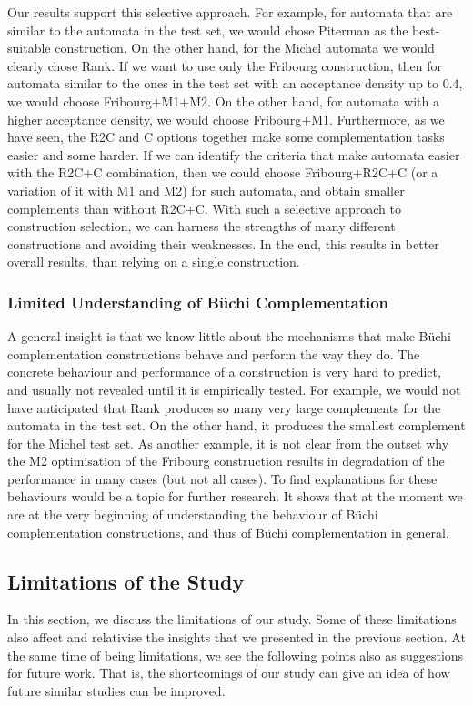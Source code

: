 Our results support this selective approach. For example, for automata that are similar to the automata in the \goal{} test set, we would chose Piterman as the best-suitable construction. On the other hand, for the Michel automata we would clearly chose Rank. If we want to use only the Fribourg construction, then for automata similar to the ones in the \goal{} test set with an acceptance density up to 0.4, we would choose Fribourg+M1+M2. On the other hand, for automata with a higher acceptance density, we would choose Fribourg+M1. Furthermore, as we have seen, the R2C and C options together make some complementation tasks easier and some harder. If we can identify the criteria that make automata easier with the R2C+C combination, then we could choose Fribourg+R2C+C (or a variation of it with M1 and M2) for such automata, and obtain smaller complements than without R2C+C. With such a selective approach to construction selection, we can harness the strengths of many different constructions and avoiding their weaknesses. In the end, this results in better overall results, than relying on a single construction.

\subsubsection{Limited Understanding of Büchi Complementation}
A general insight is that we know little about the mechanisms that make Büchi complementation constructions behave and perform the way they do. The concrete behaviour and performance of a construction is very hard to predict, and usually not revealed until it is empirically tested. For example, we would not have anticipated that Rank produces so many very large complements for the automata in the \goal{} test set. On the other hand, it produces the smallest complement for the Michel test set. As another example, it is not clear from the outset why the M2 optimisation of the Fribourg construction results in degradation of the performance in many cases (but not all cases). To find explanations for these behaviours would be a topic for further research. It shows that at the moment we are at the very beginning of understanding the behaviour of Büchi complementation constructions, and thus of Büchi complementation in general.




\subsection{Limitations of the Study}
\label{5_limitations}
In this section, we discuss the limitations of our study. Some of these limitations also affect and relativise the insights that we presented in the previous section. At the same time of being limitations, we see the following points also as suggestions for future work. That is, the shortcomings of our study can give an idea of how future similar studies can be improved.

